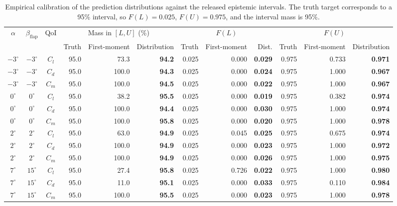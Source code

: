\documentclass[journal]{new-aiaa}
\begin{document}
\begin{table}[H]
\centering
\caption{Empirical calibration of the prediction distributions against the released epistemic intervals. The truth target corresponds to a 95\% interval, so $F(L)=0.025$, $F(U)=0.975$, and the interval mass is 95\%.}
\label{tab:uq_empirical_calibration}
\scriptsize
\setlength{\tabcolsep}{3pt}
\begin{tabular}{cccrrrrrrrrr}
\toprule
$\alpha$ & $\beta_{\mathrm{flap}}$ & QoI & \multicolumn{3}{c}{Mass in $[L,U]$ (\%)} & \multicolumn{3}{c}{$F(L)$} & \multicolumn{3}{c}{$F(U)$} \\
\cmidrule(lr){4-6}\cmidrule(lr){7-9}\cmidrule(lr){10-12}
 & & & Truth & First-moment & Distribution & Truth & First-moment & Dist. & Truth & First-moment & Distribution \\
\midrule
$-3^\circ$ & $-3^\circ$ & $C_l$ & 95.0 & 73.3 & {\bf 94.2} & 0.025 & 0.000 & {\bf 0.029} & 0.975 & 0.733 & {\bf 0.971} \\
$-3^\circ$ & $-3^\circ$ & $C_d$ & 95.0 & 100.0 & {\bf 94.3} & 0.025 & 0.000 & {\bf 0.024} & 0.975 & 1.000 & {\bf 0.967} \\
$-3^\circ$ & $-3^\circ$ & $C_m$ & 95.0 & 100.0 & {\bf 94.5} & 0.025 & 0.000 & {\bf 0.022} & 0.975 & 1.000 & {\bf 0.967} \\
\addlinespace
$0^\circ$ & $0^\circ$ & $C_l$ & 95.0 & 38.2 & {\bf 95.5} & 0.025 & 0.000 & {\bf 0.019} & 0.975 & 0.382 & {\bf 0.974} \\
$0^\circ$ & $0^\circ$ & $C_d$ & 95.0 & 100.0 & {\bf 94.4} & 0.025 & 0.000 & {\bf 0.030} & 0.975 & 1.000 & {\bf 0.974} \\
$0^\circ$ & $0^\circ$ & $C_m$ & 95.0 & 100.0 & {\bf 95.8} & 0.025 & 0.000 & {\bf 0.020} & 0.975 & 1.000 & {\bf 0.978} \\
\addlinespace
$2^\circ$ & $2^\circ$ & $C_l$ & 95.0 & 63.0 & {\bf 94.9} & 0.025 & 0.045 & {\bf 0.025} & 0.975 & 0.675 & {\bf 0.974} \\
$2^\circ$ & $2^\circ$ & $C_d$ & 95.0 & 100.0 & {\bf 94.9} & 0.025 & 0.000 & {\bf 0.023} & 0.975 & 1.000 & {\bf 0.972} \\
$2^\circ$ & $2^\circ$ & $C_m$ & 95.0 & 100.0 & {\bf 94.9} & 0.025 & 0.000 & {\bf 0.026} & 0.975 & 1.000 & {\bf 0.975} \\
\addlinespace
$7^\circ$ & $15^\circ$ & $C_l$ & 95.0 & 27.4 & {\bf 95.8} & 0.025 & 0.726 & {\bf 0.022} & 0.975 & 1.000 & {\bf 0.980} \\
$7^\circ$ & $15^\circ$ & $C_d$ & 95.0 & 11.0 & {\bf 95.1} & 0.025 & 0.000 & {\bf 0.033} & 0.975 & 0.110 & {\bf 0.984} \\
$7^\circ$ & $15^\circ$ & $C_m$ & 95.0 & 100.0 & {\bf 95.5} & 0.025 & 0.000 & {\bf 0.023} & 0.975 & 1.000 & {\bf 0.978} \\
\bottomrule
\end{tabular}
\end{table}
\end{document}
